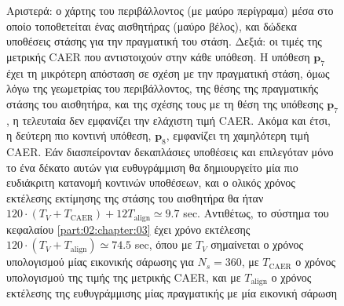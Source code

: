 \begin{figure}\centering
  \vspace{-2.5cm}
  
  \vspace{-2.5cm}
  \caption{\small Αριστερά: ο χάρτης του περιβάλλοντος (με μαύρο περίγραμα) μέσα
           στο οποίο τοποθετείται ένας αισθητήρας (μαύρο βέλος), και δώδεκα
           υποθέσεις στάσης για την πραγματική του στάση. Δεξιά: οι τιμές της
           μετρικής CAER που αντιστοιχούν στην κάθε υπόθεση. Η υπόθεση
           $\bm{p}_7$ έχει τη μικρότερη απόσταση σε σχέση με την πραγματική
           στάση, όμως λόγω της γεωμετρίας του περιβάλλοντος, της θέσης της
           πραγματικής στάσης του αισθητήρα, και της σχέσης τους με τη θέση της
           υπόθεσης $\bm{p}_7$, η τελευταία δεν εμφανίζει την ελάχιστη τιμή
           CAER. Ακόμα και έτσι, η δεύτερη πιο κοντινή υπόθεση, $\bm{p}_8$,
           εμφανίζει τη χαμηλότερη τιμή CAER. Εάν διασπείρονταν δεκαπλάσιες
           υποθέσεις και επιλεγόταν μόνο το ένα δέκατο αυτών για ευθυγράμμιση
           θα δημιουργείτο μία πιο ευδιάκριτη κατανομή κοντινών υποθέσεων, και
           ο ολικός χρόνος εκτέλεσης εκτίμησης της στάσης του αισθητήρα θα ήταν
           $120\cdot(T_V + T_{\text{CAER}}) + 12T_{\text{align}}  \simeq 9.7$
           sec. Αντιθέτως, το σύστημα του κεφαλαίου \ref{part:02:chapter:03}
           έχει χρόνο εκτέλεσης $120\cdot(T_V + T_{\text{align}}) \simeq 74.5$
           sec, όπου με $T_V$ σημαίνεται ο χρόνος υπολογισμού μίας εικονικής
           σάρωσης για $N_s=360$, με $T_{\text{CAER}}$ ο χρόνος υπολογισμού της
           τιμής της μετρικής CAER, και με $T_{\text{align}}$ ο χρόνος
           εκτέλεσης της ευθυγράμμισης μίας πραγματικής με μία εικονική σάρωση}
  \label{fig:03_02_01:global_loc}
\end{figure}

